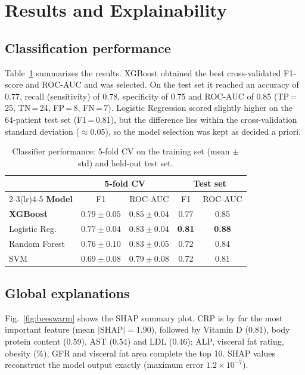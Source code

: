 \documentclass[conference]{IEEEtran}
\begin{document}
\section{Results and Explainability}
\subsection{Classification performance}
Table~\ref{tab:results} summarizes the results. XGBoost obtained the best cross-validated F1-score and ROC-AUC and was selected. On the test set it reached an accuracy of 0.77, recall (sensitivity) of 0.78, specificity of 0.75 and ROC-AUC of 0.85 (TP\,=\,25, TN\,=\,24, FP\,=\,8, FN\,=\,7). Logistic Regression scored slightly higher on the 64-patient test set (F1\,=\,0.81), but the difference lies within the cross-validation standard deviation ($\approx$0.05), so the model selection was kept as decided a priori.

\begin{table}[t]
\caption{Classifier performance: 5-fold CV on the training set (mean $\pm$ std) and held-out test set.}
\label{tab:results}
\centering
\setlength{\tabcolsep}{3.5pt}
\begin{tabular}{@{}lcccc@{}}
\toprule
 & \multicolumn{2}{c}{\textbf{5-fold CV}} & \multicolumn{2}{c}{\textbf{Test set}}\\
\cmidrule(lr){2-3}\cmidrule(lr){4-5}
\textbf{Model} & F1 & ROC-AUC & F1 & ROC-AUC\\
\midrule
\textbf{XGBoost} & $\mathbf{0.79\pm0.05}$ & $\mathbf{0.85\pm0.04}$ & 0.77 & 0.85\\
Logistic Reg. & $0.77\pm0.04$ & $0.83\pm0.04$ & \textbf{0.81} & \textbf{0.88}\\
Random Forest & $0.76\pm0.10$ & $0.83\pm0.05$ & 0.72 & 0.84\\
SVM & $0.69\pm0.08$ & $0.79\pm0.08$ & 0.72 & 0.81\\
\bottomrule
\end{tabular}
\end{table}

\subsection{Global explanations}
Fig.~\ref{fig:beeswarm} shows the SHAP summary plot. CRP is by far the most important feature (mean $|$SHAP$|=1.90$), followed by Vitamin D (0.81), body protein content (0.59), AST (0.54) and LDL (0.46); ALP, visceral fat rating, obesity (\%), GFR and visceral fat area complete the top 10. SHAP values reconstruct the model output exactly (maximum error $1.2\times10^{-7}$).
\end{document}
